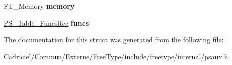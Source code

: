 \begin{DoxyCompactItemize}
\item 
\hypertarget{struct_p_s___table_rec___a061872add9c6d1af67cfdfac5ce2b80d}{F\-T\-\_\-\-Memory {\bfseries memory}}\label{struct_p_s___table_rec___a061872add9c6d1af67cfdfac5ce2b80d}

\item 
\hypertarget{struct_p_s___table_rec___adced5ad36107c90012e9fafa55eab5b9}{\hyperlink{struct_p_s___table___funcs_rec__}{P\-S\-\_\-\-Table\-\_\-\-Funcs\-Rec} {\bfseries funcs}}\label{struct_p_s___table_rec___adced5ad36107c90012e9fafa55eab5b9}

\end{DoxyCompactItemize}


The documentation for this struct was generated from the following file\-:\begin{DoxyCompactItemize}
\item 
Cadriciel/\-Commun/\-Externe/\-Free\-Type/include/freetype/internal/psaux.\-h\end{DoxyCompactItemize}
